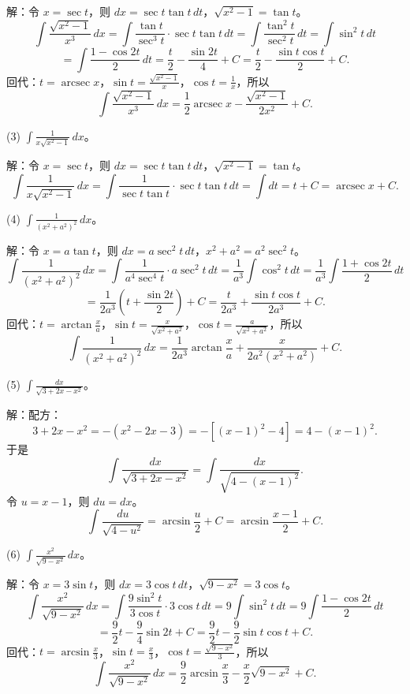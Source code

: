 解：令 \(x=\sec t\)，则 \(dx=\sec t\tan t\,dt\)，\(\sqrt{x^{2}-1}=\tan t\)。
\[ \int\frac{\sqrt{x^{2}-1}}{x^{3}}\,dx=\int\frac{\tan t}{\sec^{3}t}\cdot\sec t\tan t\,dt=\int\frac{\tan^{2}t}{\sec^{2}t}\,dt=\int\sin^{2}t\,dt \]
\[ =\int\frac{1-\cos 2t}{2}\,dt=\frac{t}{2}-\frac{\sin 2t}{4}+C=\frac{t}{2}-\frac{\sin t\cos t}{2}+C. \]
回代：\(t=\operatorname{arcsec} x\)，\(\sin t=\frac{\sqrt{x^{2}-1}}{x}\)，\(\cos t=\frac{1}{x}\)，所以
\[ \int\frac{\sqrt{x^{2}-1}}{x^{3}}\,dx=\frac{1}{2}\operatorname{arcsec} x-\frac{\sqrt{x^{2}-1}}{2x^{2}}+C. \]

(3) \(\int\frac{1}{x\sqrt{x^{2}-1}}\,dx\)。

解：令 \(x=\sec t\)，则 \(dx=\sec t\tan t\,dt\)，\(\sqrt{x^{2}-1}=\tan t\)。
\[ \int\frac{1}{x\sqrt{x^{2}-1}}\,dx=\int\frac{1}{\sec t\tan t}\cdot\sec t\tan t\,dt=\int dt=t+C=\operatorname{arcsec} x+C. \]

(4) \(\int\frac{1}{(x^{2}+a^{2})^{2}}\,dx\)。

解：令 \(x=a\tan t\)，则 \(dx=a\sec^{2}t\,dt\)，\(x^{2}+a^{2}=a^{2}\sec^{2}t\)。
\[ \int\frac{1}{(x^{2}+a^{2})^{2}}\,dx=\int\frac{1}{a^{4}\sec^{4}t}\cdot a\sec^{2}t\,dt=\frac{1}{a^{3}}\int\cos^{2}t\,dt=\frac{1}{a^{3}}\int\frac{1+\cos 2t}{2}\,dt \]
\[ =\frac{1}{2a^{3}}\left(t+\frac{\sin 2t}{2}\right)+C=\frac{t}{2a^{3}}+\frac{\sin t\cos t}{2a^{3}}+C. \]
回代：\(t=\arctan\frac{x}{a}\)，\(\sin t=\frac{x}{\sqrt{x^{2}+a^{2}}}\)，\(\cos t=\frac{a}{\sqrt{x^{2}+a^{2}}}\)，所以
\[ \int\frac{1}{(x^{2}+a^{2})^{2}}\,dx=\frac{1}{2a^{3}}\arctan\frac{x}{a}+\frac{x}{2a^{2}(x^{2}+a^{2})}+C. \]

(5) \(\int\frac{dx}{\sqrt{3+2x-x^{2}}}\)。

解：配方：
\[ 3+2x-x^{2}=-(x^{2}-2x-3)=-[(x-1)^{2}-4]=4-(x-1)^{2}. \]
于是
\[ \int\frac{dx}{\sqrt{3+2x-x^{2}}}=\int\frac{dx}{\sqrt{4-(x-1)^{2}}}. \]
令 \(u=x-1\)，则 \(du=dx\)。
\[ \int\frac{du}{\sqrt{4-u^{2}}}=\arcsin\frac{u}{2}+C=\arcsin\frac{x-1}{2}+C. \]

(6) \(\int\frac{x^{2}}{\sqrt{9-x^{2}}}\,dx\)。

解：令 \(x=3\sin t\)，则 \(dx=3\cos t\,dt\)，\(\sqrt{9-x^{2}}=3\cos t\)。
\[ \int\frac{x^{2}}{\sqrt{9-x^{2}}}\,dx=\int\frac{9\sin^{2}t}{3\cos t}\cdot 3\cos t\,dt=9\int\sin^{2}t\,dt=9\int\frac{1-\cos 2t}{2}\,dt \]
\[ =\frac{9}{2}t-\frac{9}{4}\sin 2t+C=\frac{9}{2}t-\frac{9}{2}\sin t\cos t+C. \]
回代：\(t=\arcsin\frac{x}{3}\)，\(\sin t=\frac{x}{3}\)，\(\cos t=\frac{\sqrt{9-x^{2}}}{3}\)，所以
\[ \int\frac{x^{2}}{\sqrt{9-x^{2}}}\,dx=\frac{9}{2}\arcsin\frac{x}{3}-\frac{x}{2}\sqrt{9-x^{2}}+C. \]

